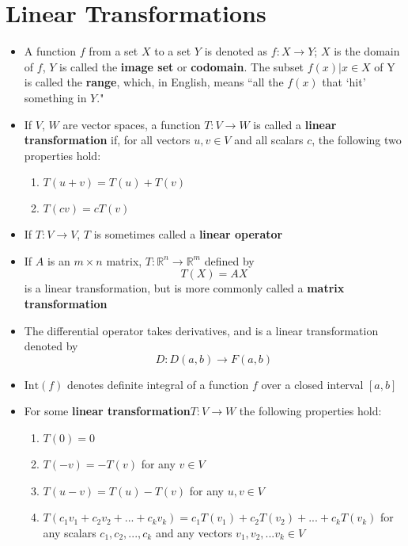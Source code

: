 \documentclass[10pt,letterpaper]{article}
\begin{document}
\section*{Linear Transformations}
\begin{itemize}
\item A function $f$ from a set $X$ to a set $Y$ is denoted as $f : X \to Y$; $X$ is the domain of $f$, $Y$ is called the \textbf{image set }or \textbf{codomain}. The subset ${f(x)| x \in X}$ of Y is called the \textbf{range}, which, in English, means ``all the $f(x)$ that `hit' something in $Y$."

\item If $V$, 	$W$ are vector spaces, a function $T : V \to W$ is called a \textbf{linear transformation} if, for all vectors $u, v \in V$ and all scalars $c$, the following two properties hold: 
\begin{enumerate}
\item $T(u+ v) = T(u) +  T(v)$ 
\item $T(cv) = cT(v)$ 
\end{enumerate}

\item If $T : V \to V$, $T$ is sometimes called a \textbf{linear operator }

\item If $A$ is an $m\times n$ matrix, $T : \mathbb{R}^n \to \mathbb{R}^m $ defined by 
$$T(X) = AX$$ is a linear transformation, but is more commonly called a \textbf{matrix transformation}

\item The differential operator takes derivatives, and is a linear transformation denoted by 
$$ D : D(a, b) \to F(a, b)$$

\item  $\mbox{Int}(f)$ denotes definite integral of a function $f$ over a closed interval $[a,b]$

\item For some \textbf{linear transformation}$T : V \to W$ the following properties hold: 
\begin{enumerate}
\item $T(0)=0$
\item $T(-v)=-T(v) $ for any $v\in V$
\item $T(u-v)=T(u)-T(v)$ for any $u, v \in V$ 
\item $T(c_1v_1+c_2v_2+...+c_kv_k)=c_1T(v_1)+c_2T(v_2)+...+c_kT(v_k)$ for any scalars 
$c_1, c_2,...,c_k$ and any vectors $v_1, v_2,...v_k\in V$
\end{enumerate}


\end{itemize}
\end{document}
